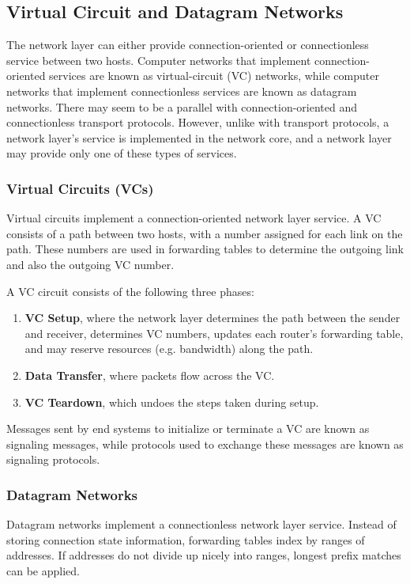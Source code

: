 \documentclass[12pt,titlepage]{article}
\begin{document}
    \subsection{Virtual Circuit and Datagram Networks}
      The network layer can either provide connection-oriented or connectionless service between two hosts. Computer networks that implement
      connection-oriented services are known as virtual-circuit (VC) networks, while computer networks that implement connectionless services
      are known as datagram networks. There may seem to be a parallel with connection-oriented and connectionless transport protocols. However,
      unlike with transport protocols, a network layer's service is implemented in the network core, and a network layer may provide only one of
      these types of services.

      \subsubsection{Virtual Circuits (VCs)}
        Virtual circuits implement a connection-oriented network layer service. A VC consists of a path between two hosts, with a number assigned
        for each link on the path. These numbers are used in forwarding tables to determine the outgoing link and also the outgoing VC number.

        A VC circuit consists of the following three phases:
        \begin{enumerate}
          \item \textbf{VC Setup}, where the network layer determines the path between the sender and receiver, determines VC numbers, updates
            each router's forwarding table, and may reserve resources (e.g. bandwidth) along the path.
          \item \textbf{Data Transfer}, where packets flow across the VC.
          \item \textbf{VC Teardown}, which undoes the steps taken during setup.
        \end{enumerate}

        Messages sent by end systems to initialize or terminate a VC are known as signaling messages, while protocols used to exchange these messages
        are known as signaling protocols.

      \subsubsection{Datagram Networks}
        Datagram networks implement a connectionless network layer service. Instead of storing connection state information, forwarding tables
        index by ranges of addresses. If addresses do not divide up nicely into ranges, longest prefix matches can be applied.
\end{document}
